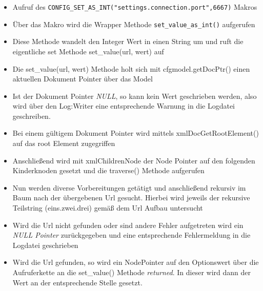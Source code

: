 \begin{itemize}

    \item Aufruf des \verb+CONFIG_SET_AS_INT("settings.connection.port",6667)+ Makros
    \item Über das Makro wird die Wrapper Methode \verb+set_value_as_int()+ aufgerufen
    \item Diese Methode wandelt den Integer Wert in einen String um und ruft die eigentliche set Methode set\_value(url, wert) auf
    \item Die set\_value(url, wert) Methode holt sich mit cfgmodel.getDocPtr() einen aktuellen Dokument Pointer über das Model
    \item Ist der Dokument Pointer \emph{NULL}, so kann kein Wert geschrieben werden, also wird über den Log:Writer
        eine entsprechende Warnung in die Logdatei geschreiben.
    \item Bei einem gültigem Dokument Pointer wird  mittels xmlDocGetRootElement() auf das root Element zugegriffen
    \item Anschließend wird mit xmlChildrenNode der Node Pointer auf den folgenden Kinderknoden gesetzt und die traverse() Methode aufgerufen
    \item Nun werden diverse Vorbereitungen getätigt und anschließend rekursiv im Baum nach der übergebenen
        Url gesucht. Hierbei wird jeweils der rekursive Teilstring (eins.zwei.drei) gemäß dem Url Aufbau untersucht

    \item Wird die Url nicht gefunden oder sind andere Fehler aufgetreten wird ein \emph{NULL Pointer} zurückgegeben und eine entsprechende Fehlermeldung in die Logdatei geschrieben
    \item Wird die Url gefunden, so wird ein NodePointer auf den Optionswert über die Aufruferkette an die set\_value() Methode \emph{returned}. In dieser wird dann der Wert an der entsprechende Stelle gesetzt.  
\end{itemize}


